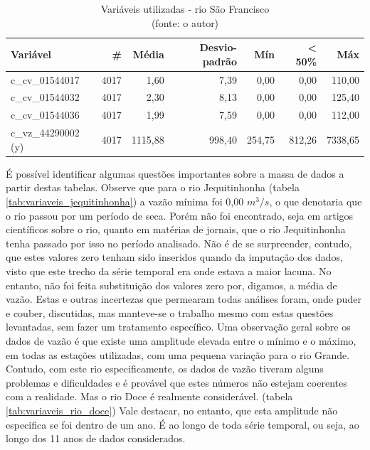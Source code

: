 \begin{table}[!h]
	\centering \small
	\caption{Variáveis utilizadas - rio São Francisco \\(fonte: o autor)}
	\begin{tabular}{|l|r|r|r|r|r|r|} \hline 
		\textbf{Variável}   & \textbf{\#} & \textbf{Média} & \textbf{Desvio-padrão} & \textbf{Mín} & \textbf{< 50\%} & \textbf{Máx} \\\hline
		c\_cv\_01544017     & 4017        & 1,60           & 7,39                   & 0,00         & 0,00            & 110,00       \\\hline
		c\_cv\_01544032     & 4017        & 2,30           & 8,13                   & 0,00         & 0,00            & 125,40       \\\hline
		c\_cv\_01544036     & 4017        & 1,99           & 7,59                   & 0,00         & 0,00            & 112,00       \\\hline
		c\_vz\_44290002 (y) & 4017        & 1115,88        & 998,40                 & 254,75       & 812,26          & 7338,65      \\\hline
	\end{tabular}
	\label{tab:variaveis_rio_sao_francisco}
\end{table}
\clearpage

É possível identificar algumas questões importantes sobre a massa de dados a partir destas tabelas. Observe que para o rio Jequitinhonha (tabela \ref{tab:variaveis_jequitinhonha}) a vazão mínima foi 0,00 $m^3/s$, o que denotaria que o rio passou por um período de seca. Porém não foi encontrado, seja em artigos científicos sobre o rio, quanto em matérias de jornais, que o rio Jequitinhonha tenha passado por isso no período analisado. Não é de se surpreender, contudo, que estes valores zero tenham sido inseridos quando da imputação dos dados, visto que este trecho da série temporal era onde estava a maior lacuna. No entanto, não foi feita substituição dos valores zero por, digamos, a média de vazão. Estas e outras incertezas que permearam todas análises foram, onde puder e couber, discutidas, mas manteve-se o trabalho mesmo com estas questões levantadas, sem fazer um tratamento específico. Uma observação geral sobre os dados de vazão é que existe uma amplitude elevada entre o mínimo e o máximo, em todas as estações utilizadas, com uma pequena variação para o rio Grande. Contudo, com este rio especificamente, os dados de vazão tiveram alguns problemas e dificuldades e é provável que estes números não estejam coerentes com a realidade. Mas o rio Doce é realmente considerável. (tabela \ref{tab:variaveis_rio_doce}) Vale destacar, no entanto, que esta amplitude não especifica se foi dentro de um ano. É ao longo de toda série temporal, ou seja, ao longo dos 11 anos de dados considerados.

